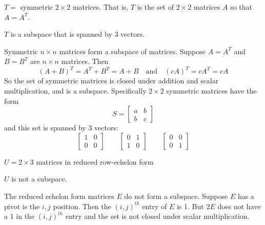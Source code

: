 \documentclass{ximera}
\begin{document}
\begin{exercise}\label{C5.2.3B}

$T = $ symmetric $2\times 2$ matrices.  That is, $T$ is the set of $2\times 2$ matrices $A$ so that $A=A^T$.

\begin{solution}

\ans $T$ is a subspace that is spanned by $3$ vectors.

\soln
Symmetric $n\times n$ matrices form a subspace of matrices.  Suppose $A= A^T$ and $B = B^T$ are $n\times n$ matrices.  Then
\[
(A+B)^T = A^T + B^T = A + B  \quad\mbox{and} \quad (cA)^T = cA^T = cA
\]
So the set of symmetric matrices is closed under addition and scalar multiplication, and is a subspace. Specifically $2\times 2$ symmetric matrices have the form  
\[
S = \begin{bmatrix}
 a & b \\  b &c  
\end{bmatrix}
\]
and this set is spanned by $3$ vectors:
\[
\begin{bmatrix}
 1 & 0 \\  0 &0  
\end{bmatrix} 
\qquad
\begin{bmatrix}
 0 & 1 \\  1 &0  
\end{bmatrix}
\qquad
\begin{bmatrix}
 0 & 0 \\  0 & 1  
\end{bmatrix}
\]
\end{solution}
\end{exercise}

\begin{exercise}\label{C5.2.3C}
$U = 2\times 3$ matrices in reduced row-echelon form

\begin{solution}

\ans $U$ is not a subspace.

\soln
The reduced echelon form matrices $E$ do not form a subspace.  Suppose $E$ has a pivot is the $i,j$ position.  Then the $(i,j)^{th}$ entry of $E$ is 1.  But $2E$ does not have a 1 in the $(i,j)^{th}$ entry and the set is not closed under scalar multiplication.
\end{solution}
\end{exercise}
\end{document}
